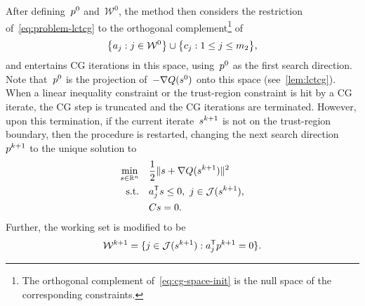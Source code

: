 After defining~$\pstep[0]$ and~$\mathcal{W}^0$, the method then considers the restriction of~\cref{eq:problem-lctcg} to the orthogonal complement\footnote{The orthogonal complement of~\cref{eq:cg-space-init} is the null space of the corresponding constraints.} of
\begin{equation}
    \label{eq:cg-space-init}
    \set[\big]{a_j : j \in \mathcal{W}^0} \cup \set[\big]{c_j : 1 \le j \le m_2},
\end{equation}
and entertains CG iterations in this space, using~$\pstep[0]$ as the first search direction.
Note that~$\pstep[0]$ is the projection of~$-\nabla Q(\sstep[0])$ onto this space (see~\cref{lem:lctcg}).
When a linear inequality constraint or the trust-region constraint is hit by a CG iterate, the CG
step is truncated and the CG iterations are terminated.
However, upon this termination, if the current iterate~$\sstep[k + 1]$ is not on the trust-region boundary, then the procedure is restarted, changing the next search direction~$\pstep[k + 1]$ to the unique solution to
\begin{subequations}
    \label{eq:tcg-linear-working-set-after}
    \begin{align}
        \min_{\sstep \in \R^n}  & \quad \frac{1}{2} \norm{\sstep + \nabla Q(\sstep[k + 1])}^2\\
        \text{s.t.}             & \quad a_j^{\T} \sstep \le 0, ~ j \in \mathcal{J}(\sstep[k + 1]),\\
                                & \quad C \sstep = 0.
    \end{align}
\end{subequations}
Further, the working set is modified to be
\begin{equation}
    \label{eq:tcg-linear-working-set-restart}
    \mathcal{W}^{k + 1} = \set{j \in \mathcal{J}(\sstep[k + 1]) : a_j^{\T} \pstep[k + 1] = 0}.
\end{equation}


